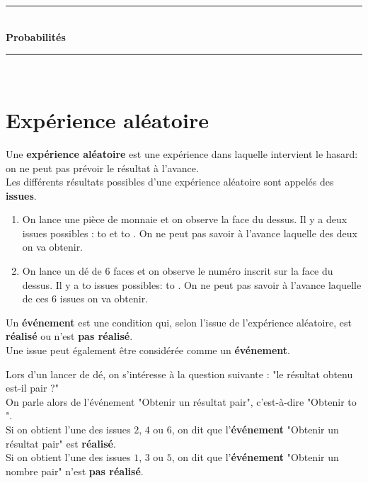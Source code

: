\documentclass[12pt]{article}
\newif\iftrou\troutrue
\newlength{\trouwidth}
\newcommand{\trou}[1]{%
	\iftrou%
	\settowidth{\trouwidth}{#1}%
	\hbox to \trouwidth{\dotfill}%
	\else%
	#1%
	\fi}
\begin{document}


\begin{center}
		\rule{\linewidth}{0.5mm} \\[0.4cm]
		{ \huge \bfseries Probabilités\\[0.4cm] }
		\rule{\linewidth}{0.5mm} \\
\end{center}



\section{Expérience aléatoire}

\begin{defin}{}{}
	Une \textbf{expérience aléatoire} est une expérience dans laquelle intervient le hasard: on ne peut pas prévoir le résultat à l'avance.\\
	Les différents résultats possibles d'une expérience aléatoire sont appelés des \textbf{issues}.
\end{defin}

\begin{ex}{}{}
	\begin{enumerate}
		\item On lance une pièce de monnaie et on observe la face du dessus. Il y a deux issues possibles : \trou{\textcolor{brown}{Pile}} et \trou{\textcolor{purple}{Face}}. On ne peut pas savoir à l'avance laquelle des deux on va obtenir. 
		\item On lance un dé de $6$ faces et on observe le numéro inscrit sur la face du dessus. Il y a \trou{$6$} issues possibles: \trou{$1$, $2$, $3$, $4$, $5$ et $6$}. On ne peut pas savoir à l'avance laquelle de ces $6$ issues on va obtenir.
	\end{enumerate}
\end{ex}

\begin{defin}{}{}
	Un \textbf{événement} est une condition qui, selon l'issue de l'expérience aléatoire, est \textbf{réalisé} ou n'est \textbf{pas réalisé}.\\
		Une issue peut également être considérée comme un \textbf{événement}.
\end{defin}


\begin{ex}{}{}
		Lors d'un lancer de dé, on s'intéresse à la question suivante : "le résultat obtenu est-il pair ?"\\
		On parle alors de l'événement "Obtenir un résultat pair", c'est-à-dire "Obtenir \trou{$2$, $4$ ou $6$}".\\
		Si on obtient l'une des issues $2$, $4$ ou $6$, on dit que l'\textbf{événement} "Obtenir un résultat pair" est \textbf{réalisé}.\\
		Si on obtient l'une des issues $1$, $3$ ou $5$, on dit que l'\textbf{événement} "Obtenir un nombre pair" n'est \textbf{pas réalisé}.
\end{ex}
\end{document}
